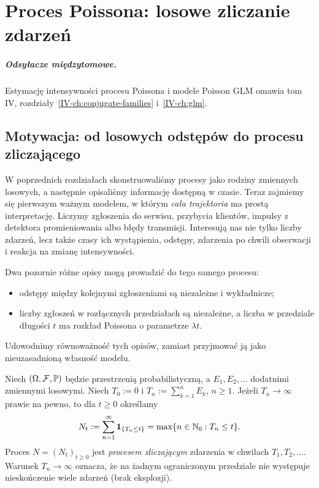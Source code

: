 \chapter{Proces Poissona: losowe zliczanie zdarzeń}
\label{ch:poisson-process}
\paragraph{Odsyłacze międzytomowe.} Estymację intensywności procesu Poissona i modele Poisson GLM omawia tom IV, rozdziały~\ref{IV-ch:conjugate-families} i~\ref{IV-ch:glm}.


\section{Motywacja: od losowych odstępów do procesu zliczającego}
W poprzednich rozdziałach skonstruowaliśmy procesy jako rodziny
zmiennych losowych, a następnie opisaliśmy informację dostępną w czasie.
Teraz zajmiemy się pierwszym ważnym modelem, w którym \emph{cała
trajektoria} ma prostą interpretację. Liczymy zgłoszenia do serwisu,
przybycia klientów, impulsy z detektora promieniowania albo błędy
transmisji. Interesują nas nie tylko liczby zdarzeń, lecz także czasy
ich wystąpienia, odstępy, zdarzenia po chwili obserwacji i reakcja na
zmianę intensywności.

Dwa pozornie różne opisy mogą prowadzić do tego samego procesu:
\begin{itemize}
\item odstępy między kolejnymi zgłoszeniami są niezależne i wykładnicze;
\item liczby zgłoszeń w rozłącznych przedziałach są niezależne, a liczba
w przedziale długości $t$ ma rozkład Poissona o parametrze $\lambda t$.
\end{itemize}
Udowodnimy równoważność tych opisów, zamiast przyjmować ją jako
nieuzasadnioną własność modelu.

\begin{definicja}
Niech $(\Omega,\mathcal{F},\mathbb{P})$ będzie przestrzenią probabilistyczną,
a $E_1,E_2,\ldots$ dodatnimi zmiennymi losowymi. Niech
$T_0:=0$ i $T_n:=\sum_{k=1}^n E_k$, $n\ge1$.
Jeżeli $T_n\to\infty$ prawie na pewno, to dla $t\ge0$ określamy
\[
N_t:=\sum_{n=1}^\infty\mathbf{1}_{\{T_n\le t\}}
      =\max\{n\in\mathbb{N}_0:T_n\le t\}.
\]
Proces $N=(N_t)_{t\ge0}$ jest \emph{procesem zliczającym} zdarzenia
w chwilach $T_1,T_2,\ldots$. Warunek $T_n\to\infty$ oznacza, że na
żadnym ograniczonym przedziale nie występuje nieskończenie wiele
zdarzeń (brak eksplozji).
\end{definicja}

